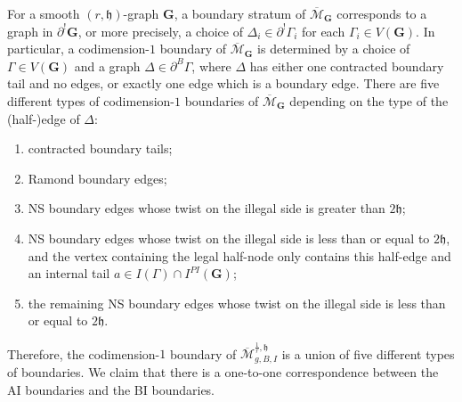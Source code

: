 \documentclass[11pt,a4paper]{article}
\theoremstyle{definition}
\theoremstyle{remark}
\numberwithin{equation}{section}
\def\Mbar{{\overline{\mathcal M}}}
\def\h{{\mathfrak h}}
\begin{document}
For a smooth $(r,\h)$-graph $\mathbf{G}$, a boundary stratum of $\Mbar_{\bm{G}}$ corresponds to a graph in $\partial^!\mathbf{G}$, or more precisely, a choice of $\Delta_i\in \partial^!\Gamma_i$ for each $\Gamma_i\in V(\mathbf{G})$. In particular,  a codimension-$1$ boundary of $\Mbar_\mathbf{G}$ is determined by a choice of $\Gamma\in V(\mathbf{G})$ and a graph $\Delta \in \partial^B \Gamma$, where $\Delta$ has either one contracted boundary tail and no edges, or exactly one edge which is a boundary edge. There are five different types of codimension-$1$ boundaries of $\Mbar_\mathbf{G}$ depending on the type of the (half-)edge of $\Delta$:


\begin{enumerate}
    \item[{CB}] contracted boundary tails;
    \item[{R}] Ramond boundary edges;
    \item[{NS+}] NS boundary edges whose twist on the illegal side is greater than $2\h$;
    \item[AI] NS boundary edges whose twist on the illegal side is less than or equal to $2\h$, and the vertex containing the legal half-node only contains this half-edge and an internal tail $a\in I(\Gamma)\cap I^{PI}(\mathbf{G})$;
    \item[BI] the remaining NS boundary edges whose twist on the illegal side is less than or equal to $2\h$.
\end{enumerate}


Therefore, the codimension-$1$ boundary of $\Mbar^{\frac{1}{r},\h}_{g,B,I}$ is a union of five different types of boundaries. We claim that there is a one-to-one correspondence between the AI boundaries and the BI boundaries. 
\end{document}
